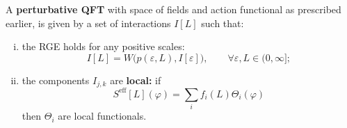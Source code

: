 \begin{definition}
  A \textbf{perturbative QFT} with space of fields and action functional as prescribed earlier, is given by a set of interactions $I[L]$ such that:
  \begin{enumerate}[i)]
    \item the RGE holds for any positive scales:
      \begin{equation*}
        I[L] = W \bigl(p(\varepsilon, L), I[\varepsilon]\bigr), \qquad
        \forall \varepsilon, L \in (0, \infty];
      \end{equation*}
    \item the components $I_{j, k}$ are \textbf{local:} if
      \begin{equation*}
        S^\text{eff}[L] (\varphi)
        = \sum_{i} f_i (L) \Theta_i (\varphi)
      \end{equation*}
      then $\Theta_i$ are local functionals.
  \end{enumerate}
\end{definition}
